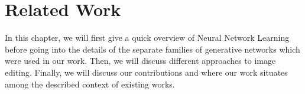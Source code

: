 
\chapter{Related Work}
\label{chapter:related}



















In this chapter, we will first give a quick overview of Neural Network Learning before 
going into the details of the separate families of generative networks which were used in our work. 
Then, we will discuss different approaches to image editing. Finally, we will discuss our contributions 
and where our work situates among the described context of existing works. 

